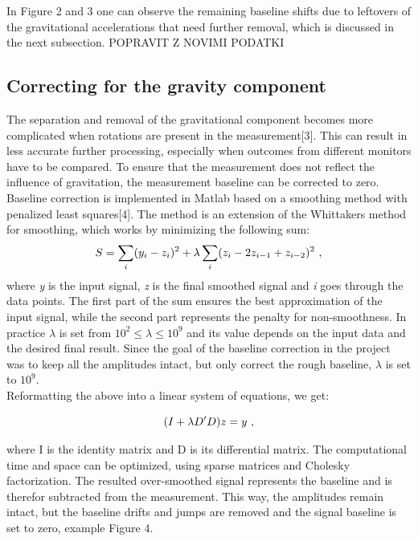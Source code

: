 \documentclass{article}
\begin{document}
{In Figure 2 and 3 one can observe the remaining baseline shifts due to leftovers of the gravitational accelerations that need further removal, which is discussed in the next subsection. 
POPRAVIT Z NOVIMI PODATKI
\subsection{Correcting for the gravity component}
The separation and removal of the gravitational component becomes more complicated when rotations are present in the measurement[3]. This can result in less accurate further processing, especially when outcomes from different monitors have to be compared. To ensure that the measurement does not reflect the influence of gravitation, the measurement baseline can be corrected to zero. Baseline correction is implemented in Matlab based on a smoothing method with penalized least squares[4]. The method is an extension of the Whittakers method for smoothing, which works by minimizing the following sum: 
\begin{equation}
S=\sum_{i} (y_i - z_i)^2  +  \lambda\sum_{i} (z_i - 2z_{i-1} + z_{i-2})^2\thinspace \thinspace ,
\end{equation}
where \textit{y} is the input signal, \textit{z} is the final smoothed signal and \textit{i} goes through the data points.
The first part of the sum ensures the best approximation of the input signal, while the second part represents the penalty for non-smoothness. 
In practice $\lambda$ is set from $ 10^{2} \leq \lambda \leq 10^{9}$ and its value depends on the input data and the desired final result. Since the goal of the baseline correction in the project was to keep all the amplitudes intact, but only correct the rough baseline, $\lambda$ is set to $10^{9}$.
\\
Reformatting the above into a linear system of equations, we get:

\begin{equation}
(I + \lambda D'D)z = y\thinspace \thinspace ,
\end{equation}

where I is the identity matrix and D is its differential matrix. 
The computational time and space can be optimized, using sparse matrices and Cholesky factorization. The resulted over-smoothed signal represents the baseline and is therefor subtracted from the measurement. This way, the amplitudes remain intact, but the baseline drifts and jumps are removed and the signal baseline is set to zero, example Figure 4. 

}
\end{document}
